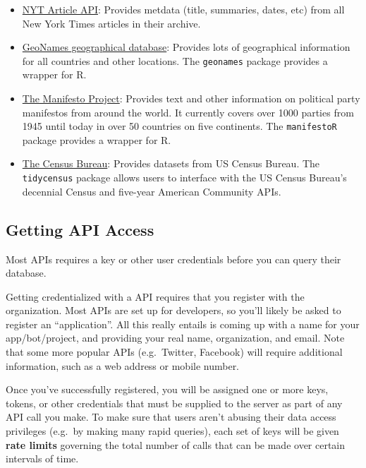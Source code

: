 \documentclass[]{book}
\providecommand{\tightlist}{%
  \setlength{\itemsep}{0pt}\setlength{\parskip}{0pt}}
\begin{document}
\begin{itemize}
\tightlist
\item
  \href{http://developer.nytimes.com/}{NYT Article API}: Provides
  metdata (title, summaries, dates, etc) from all New York Times
  articles in their archive.
\item
  \href{https://www.geonames.org/}{GeoNames geographical database}:
  Provides lots of geographical information for all countries and other
  locations. The \texttt{geonames} package provides a wrapper for R.
\item
  \href{https://manifesto-project.wzb.eu/.}{The Manifesto Project}:
  Provides text and other information on political party manifestos from
  around the world. It currently covers over 1000 parties from 1945
  until today in over 50 countries on five continents. The
  \texttt{manifestoR} package provides a wrapper for R.
\item
  \href{https://www.census.gov/developers/}{The Census Bureau}: Provides
  datasets from US Census Bureau. The \texttt{tidycensus} package allows
  users to interface with the US Census Bureau's decennial Census and
  five-year American Community APIs.
\end{itemize}

\subsection{Getting API Access}\label{getting-api-access}

Most APIs requires a key or other user credentials before you can query
their database.

Getting credentialized with a API requires that you register with the
organization. Most APIs are set up for developers, so you'll likely be
asked to register an ``application''. All this really entails is coming
up with a name for your app/bot/project, and providing your real name,
organization, and email. Note that some more popular APIs (e.g.~Twitter,
Facebook) will require additional information, such as a web address or
mobile number.

Once you've successfully registered, you will be assigned one or more
keys, tokens, or other credentials that must be supplied to the server
as part of any API call you make. To make sure that users aren't abusing
their data access privileges (e.g.~by making many rapid queries), each
set of keys will be given \textbf{rate limits} governing the total
number of calls that can be made over certain intervals of time.
\end{document}

